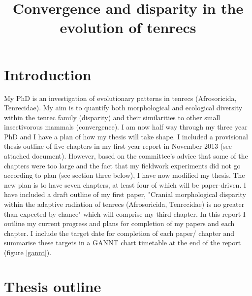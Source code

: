 \documentclass[12pt,a4paper]{article}
\begin{document}
\title{Convergence and disparity in the evolution of tenrecs}
\author{}
\date{}
\maketitle


\renewcommand{\headrulewidth}{0.0pt}
\thispagestyle{fancy}				%
\chead{}


\section{Introduction}
My PhD is an investigation of evolutionary patterns in tenrecs (Afrosoricida, Tenrecidae). My aim is to quantify both morphological and ecological diversity within the tenrec family (disparity) and their similarities to other small insectivorous mammals (convergence). 
I am now half way through my three year PhD and I have a plan of how my thesis will take shape. I included a provisional thesis outline of five chapters in my first year report in November 2013 (see attached document). However, based on the committee's advice that some of the chapters were too large and the fact that my fieldwork experiments did not go according to plan (see section three below), I have now modified my thesis.  The new plan is to have seven chapters, at least four of which will be paper-driven. I have included a draft outline of my first paper, "Cranial morphological disparity within the adaptive radiation of tenrecs (Afrosoricida, Tenrecidae) is no greater than expected by chance" which will comprise my third chapter.
In this report I outline my current progress and plans for completion of my papers and each chapter. I include the target date for completion of each paper/ chapter and summarise these targets in a GANNT chart timetable at the end of the report (figure \ref{gannt}). 

\newpage

\section{Thesis outline}
\end{document}

